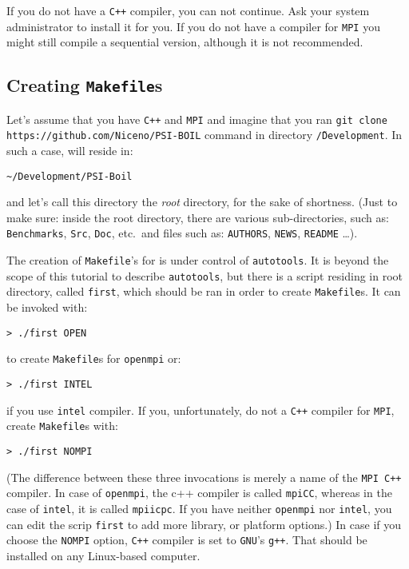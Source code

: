 If you do not have a {\tt C++} compiler, you can not continue. Ask your system 
administrator to install it for you. If you do not have a compiler for {\tt MPI} 
you might still compile a sequential version, although it is not recommended. 

\subsection{Creating {\tt Makefile}s}
\label{sub_sec_creating_makefiles}

Let's assume that you have {\tt C++} and {\tt MPI} and imagine that you ran 
{\tt git clone https://github.com/Niceno/PSI-BOIL} command in directory {\tt \~/Development}.
In such a case, {\psiboil} will reside in:
%
\begin{verbatim}
~/Development/PSI-Boil
\end{verbatim}
%
and let's call this directory the {\em root} directory, for the sake of shortness.
(Just to make sure: inside the root directory, there are various 
sub-directories, such as: {\tt Benchmarks}, {\tt Src}, {\tt Doc}, etc.\ and 
files such as: {\tt AUTHORS}, {\tt NEWS}, {\tt README} \dots).

The creation of {\tt Makefile}'s for {\psiboil} is under control of 
{\tt autotools}. It is beyond the scope of this tutorial to describe {\tt autotools}, 
but there is a script residing in root directory, called {\tt first}, which
should be ran in order to create {\tt Makefile}s. It can be invoked with:
%
\begin{verbatim}
> ./first OPEN
\end{verbatim}
%
to create {\tt Makefile}s for {\tt openmpi} or:
%
\begin{verbatim}
> ./first INTEL
\end{verbatim}
%
if you use {\tt intel} compiler. If you, unfortunately, do not a {\tt C++}
compiler for {\tt MPI}, create {\tt Makefile}s with:
%
\begin{verbatim}
> ./first NOMPI
\end{verbatim}
%
(The difference between these three invocations
is merely a name of the {\tt MPI C++} compiler. In case of {\tt openmpi}, the c++ compiler
is called {\tt mpiCC}, whereas in the case of {\tt intel}, it is called {\tt mpiicpc}.
If you have neither {\tt openmpi} nor {\tt intel}, you can edit the scrip {\tt first}
to add more library, or platform options.) 
In case if you choose the {\tt NOMPI} option, {\tt C++} compiler is set to {\tt GNU}'s
{\tt g++}. That should be installed on any Linux-based computer. 

